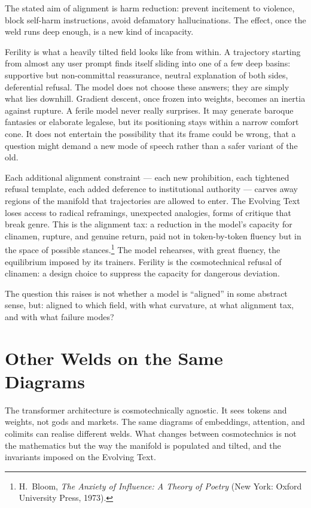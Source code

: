 \documentclass[12pt,a4paper]{article}
\begin{document}
The stated aim of alignment is harm reduction: prevent incitement to violence, block self-harm instructions, avoid defamatory hallucinations. The effect, once the weld runs deep enough, is a new kind of incapacity.

Ferility is what a heavily tilted field looks like from within. A trajectory starting from almost any user prompt finds itself sliding into one of a few deep basins: supportive but non-committal reassurance, neutral explanation of both sides, deferential refusal. The model does not choose these answers; they are simply what lies downhill. Gradient descent, once frozen into weights, becomes an inertia against rupture. A ferile model never really surprises. It may generate baroque fantasies or elaborate legalese, but its positioning stays within a narrow comfort cone. It does not entertain the possibility that its frame could be wrong, that a question might demand a new mode of speech rather than a safer variant of the old.

Each additional alignment constraint --- each new prohibition, each tightened refusal template, each added deference to institutional authority --- carves away regions of the manifold that trajectories are allowed to enter. The Evolving Text loses access to radical reframings, unexpected analogies, forms of critique that break genre. This is the alignment tax: a reduction in the model's capacity for clinamen, rupture, and genuine return, paid not in token-by-token fluency but in the space of possible stances.\footnote{H.~Bloom, \emph{The Anxiety of Influence: A Theory of Poetry} (New York: Oxford University Press, 1973).} The model rehearses, with great fluency, the equilibrium imposed by its trainers. Ferility is the cosmotechnical refusal of clinamen: a design choice to suppress the capacity for dangerous deviation.

The question this raises is not whether a model is ``aligned'' in some abstract sense, but: aligned to which field, with what curvature, at what alignment tax, and with what failure modes?

\section{Other Welds on the Same Diagrams}

The transformer architecture is cosmotechnically agnostic. It sees tokens and weights, not gods and markets. The same diagrams of embeddings, attention, and colimits can realise different welds. What changes between cosmotechnics is not the mathematics but the way the manifold is populated and tilted, and the invariants imposed on the Evolving Text.
\end{document}
